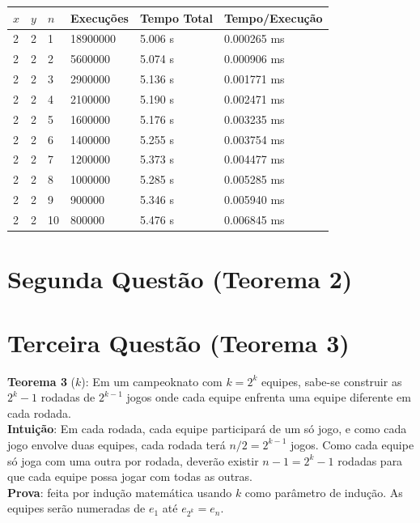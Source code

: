 \documentclass{article}
\begin{document}
\begin{table}[H]
\centering
\begin{tabular}{l|l|l|l|l|l}
$x$ & $y$ & $n$ & Execuções & Tempo Total & Tempo/Execução \\\hline
2 & 2 & 1 & 18900000 & 5.006 s & 0.000265 ms \\
2 & 2 & 2 & 5600000 & 5.074 s & 0.000906 ms \\
2 & 2 & 3 & 2900000 & 5.136 s & 0.001771 ms \\
2 & 2 & 4 & 2100000 & 5.190 s & 0.002471 ms \\
2 & 2 & 5 & 1600000 & 5.176 s & 0.003235 ms \\
2 & 2 & 6 & 1400000 & 5.255 s & 0.003754 ms \\
2 & 2 & 7 & 1200000 & 5.373 s & 0.004477 ms \\
2 & 2 & 8 & 1000000 & 5.285 s & 0.005285 ms \\
2 & 2 & 9 & 900000 & 5.346 s & 0.005940 ms \\
2 & 2 & 10 & 800000 & 5.476 s & 0.006845 ms \\
\end{tabular}
\end{table}

\pagebreak

\section{Segunda Questão (Teorema 2)}

\pagebreak

\section{Terceira Questão (Teorema 3)}

\textbf{Teorema 3} ($k$): Em um campeoknato com $k = 2^k$ equipes, sabe-se construir as $2^k - 1$ rodadas de $2^{k - 1}$ jogos onde cada equipe enfrenta uma equipe diferente em cada rodada.\\

\textbf{Intuição}: Em cada rodada, cada equipe participará de um só jogo, e como cada jogo envolve duas equipes, cada rodada terá $n/2 = 2^{k-1}$ jogos. Como cada equipe só joga com uma outra por rodada, deverão existir $n-1 = 2^k -1$ rodadas para que cada equipe possa jogar com todas as outras.\\

\textbf{Prova}: feita por indução matemática usando $k$ como parâmetro de indução. As equipes serão numeradas de $e_1$ até $e_{2^k} = e_n$.\\
\end{document}
